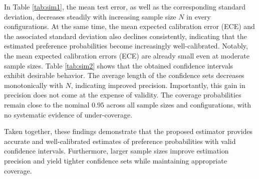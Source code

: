 \documentclass[12pt]{amsart}
\theoremstyle{plain}
\theoremstyle{remark}
\numberwithin{equation}{section}
\begin{document}
In Table \ref{tab:sim1}, the mean test error, as well as the corresponding standard deviation, decreases steadily with increasing sample size $N$ in every configurations. At the same time, the mean expected calibration error (ECE) and the associated standard deviation also declines consistently, indicating that the estimated preference probabilities become increasingly well-calibrated. Notably, the mean expected calibration errors (ECE) are already small even at moderate sample sizes. Table \ref{tab:sim2} shows that the obtained confidence intervals exhibit desirable behavior. The average length of the confidence sets decreases monotonically with $N$, indicating improved precision. Importantly, this gain in precision does not come at the expense of validity. The coverage probabilities remain close to the nominal $0.95$ across all sample sizes and configurations, with no systematic evidence of under-coverage.

Taken together, these findings demonstrate that the proposed estimator provides accurate and well-calibrated estimates of preference probabilities with valid confidence intervals. Furthermore, larger sample sizes improve estimation precision and yield tighter confidence sets while maintaining appropriate coverage.
\end{document}
